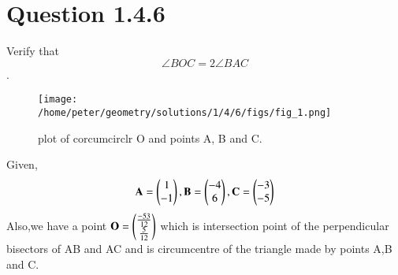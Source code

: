 \documentclass[journal,12pt,twocolumn]{IEEEtran}
\theoremstyle{remark}
\begin{document}
\section{Question 1.4.6}
Verify that$$\angle{BOC} = 2\angle{BAC}$$.
\fi
\begin{figure}
              \centering
              \texttt{[image: /home/peter/geometry/solutions/1/4/6/figs/fig\_1.png]}
              \caption{plot of corcumcirclr O and points A, B and C.}
              \label{fig:0}
\end{figure}

\solution
Given,$$\mathbf{A}=\begin{pmatrix}1\\-1\end{pmatrix}, 
\mathbf{B}=\begin{pmatrix}-4\\6\end{pmatrix}, 
\mathbf{C}=\begin{pmatrix}-3\\-5\end{pmatrix}$$
Also,we have a point $\mathbf{O}=\begin{pmatrix}\frac{-53}{12}\\\frac{5}{12}\end{pmatrix}$
which is intersection point of the perpendicular bisectors of AB and AC and is circumcentre of the triangle made by points A,B and C.
\end{document}

